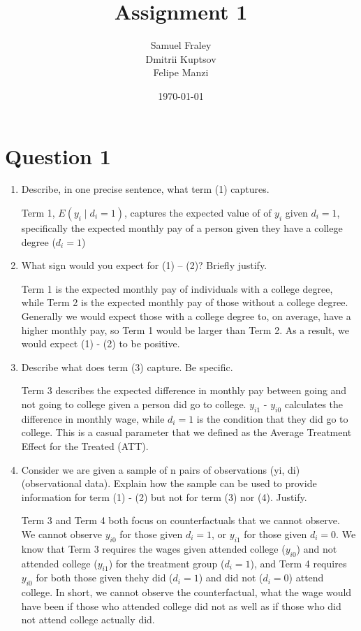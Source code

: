 \documentclass[12pt,a4paper]{article}
\title{Assignment 1}
\author{
  Samuel Fraley \\
  Dmitrii Kuptsov \\
  Felipe Manzi
}
\date{\today}
\begin{document}
\maketitle
\tableofcontents
\newpage

\section*{Question 1}
\begin{enumerate}[label=(\alph*)]
  \item Describe, in one precise sentence, what term (1) captures.

  Term 1, $E(y_{i} \mid d_i = 1)$, captures the expected value of of $y_{i}$ given $d_{i} = 1$, specifically the expected monthly pay of a person given they have a college degree ($d_{i} = 1$)

  \item What sign would you expect for (1) – (2)? Briefly justify.

  Term 1 is the expected monthly pay of individuals with a college degree, while Term 2 is the expected monthly pay of those without a college degree. Generally we would expect those with a college degree to, on average, have a higher monthly pay, so Term 1 would be larger than Term 2. As a result, we would expect (1) - (2) to be positive.
  
  \item Describe what does term (3) capture. Be specific.

  Term 3 describes the expected difference in monthly pay between going and not going to college given a person did go to college. $y_{i1}$ - $y_{i0}$ calculates the difference in monthly wage, while $d_{i} = 1$ is the condition that they did go to college. This is a casual parameter that we defined as the Average Treatment Effect for the Treated (ATT).
  
  \item Consider we are given a sample of n pairs of observations (yi, di) (observational data). Explain how the sample can be used to provide information for term (1) - (2) but not for term (3) nor (4). Justify.

  Term 3 and Term 4 both focus on counterfactuals that we cannot observe. We cannot observe ${y_{i0}}$ for those given ${d_{i} = 1}$, or ${y_{i1}}$ for those given ${d_{i} = 0}$. We know that Term 3 requires the wages given attended college ($y_{i0}$) and not attended college ($y_{i1}$) for the treatment group ({$d_{i} = 1$}), and Term 4 requires $y_{i0}$ for both those given thehy did ($d_{i} = 1$) and did not ($d_{i} = 0$) attend college. In short, we cannot observe the counterfactual, what the wage would have been if those who attended college did not as well as if those who did not attend college actually did.
  

\end{enumerate}
\end{document}
